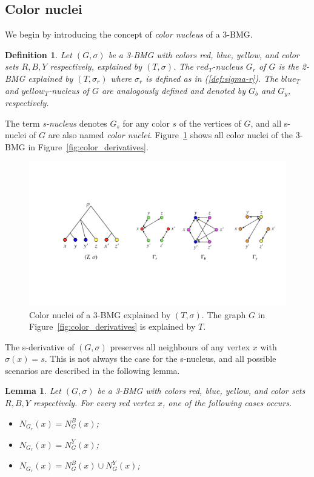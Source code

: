 \documentclass[final,3p,times]{elsarticle}
\newtheorem{lemma}[theorem]{Lemma}%
\newtheorem{definition}{Definition}[section]
\begin{document}
\subsection{Color nuclei}
We begin by introducing the concept of \emph{color nucleus} of a 3-BMG. 
\begin{definition}
Let $(G,\sigma)$ be a 3-BMG with colors red, blue, yellow, and color sets $R,B,Y$ respectively, explained by $(T,\sigma)$. The $red_T${\emph{-nucleus}} $G_r$ of $G$ is the 2-BMG explained by $(T,\sigma_r)$ where $\sigma_r$ is defined as in (\ref{def:sigma-r}). The $blue_T$ and $yellow_T${\emph{-nucleus}} of $G$ are analogously defined and denoted by $G_b$ and $G_y$, respectively. 
\end{definition}
The term \emph{s-nucleus} denotes $G_s$ for any color $s$ of the vertices of $G$, and all s-nuclei of $G$ are also named \emph{color nuclei}. Figure~\ref{fig:color_nuclei} shows all color nuclei of the 3-BMG in Figure~\ref{fig:color_derivatives}.
\begin{figure}[ht]
  \centering
    \includegraphics[width=16cm]{figures/color_nuclei.jpeg}
    \caption{Color nuclei of a 3-BMG explained by $(T,\sigma)$. The graph $G$ in Figure~\ref{fig:color_derivatives} is explained by $T$.}
      \label{fig:color_nuclei}
\end{figure}
The s-derivative of $(G,\sigma)$ preserves all neighbours of any vertex $x$ with $\sigma(x)=s$. This is not always the case for the s-nucleus, and all possible scenarios are described in the following lemma. 
\begin{lemma}
\label{lemma:neighbours_condition}
Let $(G,\sigma)$ be a 3-BMG with colors red, blue, yellow, and color sets $R,B,Y$ respectively. For every red vertex $x$, one of the following cases occurs.
\begin{itemize}
\item[(i)] $N_{G_r}(x)=N_{G}^{B}(x)$;
\item[(ii)] $N_{G_r}(x)=N_{G}^{Y}(x)$;
\item[(iii)] $N_{G_r}(x)=N_{G}^{B}(x)\cup N_{G}^{Y}(x)$;
\end{itemize}
\end{lemma}
\end{document}
